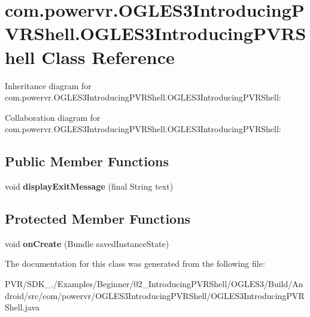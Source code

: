 \hypertarget{classcom_1_1powervr_1_1_o_g_l_e_s3_introducing_p_v_r_shell_1_1_o_g_l_e_s3_introducing_p_v_r_shell}{\section{com.\+powervr.\+O\+G\+L\+E\+S3\+Introducing\+P\+V\+R\+Shell.\+O\+G\+L\+E\+S3\+Introducing\+P\+V\+R\+Shell Class Reference}
\label{classcom_1_1powervr_1_1_o_g_l_e_s3_introducing_p_v_r_shell_1_1_o_g_l_e_s3_introducing_p_v_r_shell}
}


Inheritance diagram for com.\+powervr.\+O\+G\+L\+E\+S3\+Introducing\+P\+V\+R\+Shell.\+O\+G\+L\+E\+S3\+Introducing\+P\+V\+R\+Shell\+:


Collaboration diagram for com.\+powervr.\+O\+G\+L\+E\+S3\+Introducing\+P\+V\+R\+Shell.\+O\+G\+L\+E\+S3\+Introducing\+P\+V\+R\+Shell\+:
\subsection*{Public Member Functions}
\begin{DoxyCompactItemize}
\item 
\hypertarget{classcom_1_1powervr_1_1_o_g_l_e_s3_introducing_p_v_r_shell_1_1_o_g_l_e_s3_introducing_p_v_r_shell_a9ea06a1a64c1fd4da12d1d780c890bae}{void {\bfseries display\+Exit\+Message} (final String text)}\label{classcom_1_1powervr_1_1_o_g_l_e_s3_introducing_p_v_r_shell_1_1_o_g_l_e_s3_introducing_p_v_r_shell_a9ea06a1a64c1fd4da12d1d780c890bae}

\end{DoxyCompactItemize}
\subsection*{Protected Member Functions}
\begin{DoxyCompactItemize}
\item 
\hypertarget{classcom_1_1powervr_1_1_o_g_l_e_s3_introducing_p_v_r_shell_1_1_o_g_l_e_s3_introducing_p_v_r_shell_a32dd2f99ed8105e33679f3a04201169e}{void {\bfseries on\+Create} (Bundle saved\+Instance\+State)}\label{classcom_1_1powervr_1_1_o_g_l_e_s3_introducing_p_v_r_shell_1_1_o_g_l_e_s3_introducing_p_v_r_shell_a32dd2f99ed8105e33679f3a04201169e}

\end{DoxyCompactItemize}


The documentation for this class was generated from the following file\+:\begin{DoxyCompactItemize}
\item 
P\+V\+R/\+S\+D\+K\+\_./\+Examples/\+Beginner/02\+\_\+\+Introducing\+P\+V\+R\+Shell/\+O\+G\+L\+E\+S3/\+Build/\+Android/src/com/powervr/\+O\+G\+L\+E\+S3\+Introducing\+P\+V\+R\+Shell/O\+G\+L\+E\+S3\+Introducing\+P\+V\+R\+Shell.\+java\end{DoxyCompactItemize}
